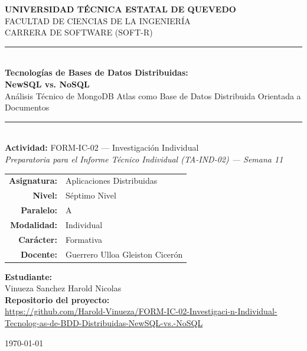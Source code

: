 \documentclass[10pt,journal]{IEEEtran}
\begin{document}
\begin{titlepage}
\centering
\vspace*{1.2cm}

{\large \textbf{UNIVERSIDAD T\'ECNICA ESTATAL DE QUEVEDO}\\}
\vspace{0.2cm}
{\normalsize FACULTAD DE CIENCIAS DE LA INGENIER\'IA\\}
{\normalsize CARRERA DE SOFTWARE (SOFT-R)\\}

\vspace{1.6cm}
\rule{\linewidth}{0.4mm}\\[0.4cm]
{\LARGE \textbf{Tecnolog\'ias de Bases de Datos Distribuidas:\\ NewSQL vs. NoSQL}}\\[0.3cm]
{\Large An\'alisis T\'ecnico de MongoDB Atlas como Base de Datos Distribuida Orientada a Documentos}\\[0.4cm]
\rule{\linewidth}{0.4mm}\\[1.0cm]

{\large \textbf{Actividad:} FORM-IC-02 --- Investigaci\'on Individual\\[0.15cm]
\textit{Preparatoria para el Informe T\'ecnico Individual (TA-IND-02) --- Semana 11}}\\[1.2cm]

\begin{tabular}{rl}
\textbf{Asignatura:} & Aplicaciones Distribuidas \\[0.1cm]
\textbf{Nivel:} & S\'eptimo Nivel \\[0.1cm]
\textbf{Paralelo:} & A \\[0.1cm]
\textbf{Modalidad:} & Individual \\[0.1cm]
\textbf{Car\'acter:} & Formativa \\[0.1cm]
\textbf{Docente:} & Guerrero Ulloa Gleiston Cicer\'on\\[0.1cm]
\end{tabular}

\vspace{1.2cm}
{\large \textbf{Estudiante:}\\ Vinueza Sanchez Harold Nicolas }\\[1.0cm]

{\normalsize \textbf{Repositorio del proyecto:}\\
\url{https://github.com/Harold-Vinueza/FORM-IC-02-Investigaci-n-Individual-Tecnolog-as-de-BDD-Distribuidas-NewSQL-vs.-NoSQL}}

\vfill
{\normalsize \today}

\end{titlepage}
\end{document}
